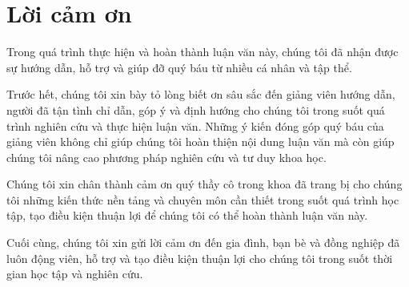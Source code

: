 \cleardoublepage
\section*{Lời cảm ơn}
Trong quá trình thực hiện và hoàn thành luận văn này, chúng tôi đã nhận được sự hướng dẫn, hỗ trợ
và giúp đỡ quý báu từ nhiều cá nhân và tập thể.

Trước hết, chúng tôi xin bày tỏ lòng biết ơn sâu sắc đến giảng viên hướng dẫn, người đã tận tình chỉ
dẫn, góp ý và định hướng cho chúng tôi trong suốt quá trình nghiên cứu và thực hiện luận văn. Những
ý kiến đóng góp quý báu của giảng viên không chỉ giúp chúng tôi hoàn thiện nội dung luận văn mà còn
giúp chúng tôi nâng cao phương pháp nghiên cứu và tư duy khoa học.

Chúng tôi xin chân thành cảm ơn quý thầy cô trong khoa đã trang bị cho chúng tôi những kiến thức nền tảng
và chuyên môn cần thiết trong suốt quá trình học tập, tạo điều kiện thuận lợi để chúng tôi có thể hoàn
thành luận văn này.

Cuối cùng, chúng tôi xin gửi lời cảm ơn đến gia đình, bạn bè và đồng nghiệp đã luôn động viên, hỗ trợ
và tạo điều kiện thuận lợi cho chúng tôi trong suốt thời gian học tập và nghiên cứu.